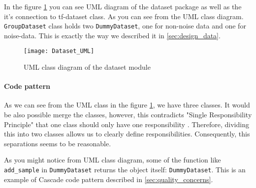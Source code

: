 In the figure \ref{fig:dataset_uml} you can see UML diagram of the dataset package
as well as the it's connection to tf-dataset class. As you can see from the UML
class diagram.
\lstinline{GroupDataset} class holds two \lstinline{DummyDataset}, one for
non-noise data and one for noise-data. This is exactly the way
we described it in \autoref{sec:design_data}.
\begin{figure}
	\texttt{[image: Dataset\_UML]}
	\caption{UML class diagram of the dataset module}
	\label{fig:dataset_uml}
\end{figure}

\paragraph{Code pattern} As we can see from the UML class in the figure
\ref{fig:dataset_uml}, we have three classes. It would be also possible
merge the classes, however, this contradicts "Single Responsibility Principle"
that one class should only have one responsibility \cite{martin2003agile}.
Therefore, dividing this into two classes allows us to clearly
define responsibilities. Consequently, this separations seems to be reasonable.

As you might notice from UML class diagram, some of the function like
\lstinline{add_sample} in \lstinline{DummyDataset} returns the object itself: \lstinline{DummyDataset}.
This is an example of Cascade code pattern described in \autoref{sec:quality_concerns}.

%

%
%
%
%
%

%

